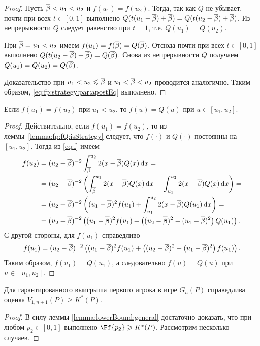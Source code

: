 {\begin{proof}
  Пусть ${\overline{\beta}} < u_1 < u_2$ и $f(u_1) = f(u_2)$.
  Тогда, так как $Q$ не убывает, почти при всех $t \in [0, 1]$ выполнено $ Q(t(u_1 - {\overline{\beta}}) + {\overline{\beta}}) = Q(t(u_2 - {\overline{\beta}}) + {\overline{\beta}})$.
  Из непрерывности $Q$ следует равенство при $t = 1$, т.е. $Q(u_1) = Q(u_2)$.

  При ${\overline{\beta}} = u_1 < u_2$ имеем $f(u_1) = f({\overline{\beta}}) = Q({\overline{\beta}})$.
  Отсюда почти при всех $t \in [0, 1]$ выполнено $Q(t(u_2 - {\overline{\beta}}) + {\overline{\beta}}) = Q({\overline{\beta}})$.
  Снова из непрерывности $Q$ получаем $Q(u_1) = Q(u_2) = Q({\overline{\beta}})$.

  Доказательство при $u_1 < u_2 \leqslant {\overline{\beta}}$ и $u_1 < {\overline{\beta}} < u_2$ проводится аналогично.
  Таким образом, \eqref{eq:fp:strategy:par:apostEq} выполнено.
\end{proof}

\begin{lemma}
  \label{lemma:f=Q}
  Если $f(u_1) = f(u_2)$ при $u_1 < u_2$, то $f(u) = Q(u)$ при $u \in [u_1, u_2]$.
\end{lemma}
\begin{proof}
  Действительно, если $f(u_1) = f(u_2)$, то из леммы~\ref{lemma:fp:fQ:isStrategy} следует, что $f(\cdot)$ и $Q(\cdot)$ постоянны на $[u_1, u_2]$.
  Тогда из \eqref{eq:f} имеем
  \begin{align*}
    f(u_2)
    &= (u_2 - {\overline{\beta}})^{-2} \int_{{\overline{\beta}}}^{u_2} 2 (x - {\overline{\beta}}) Q(x) \mathop{}\!\mathrm{d} x = \\
    &= (u_2 - {\overline{\beta}})^{-2} \left(
      \int_{{\overline{\beta}}}^{u_1} 2 (x - {\overline{\beta}}) Q(x) \mathop{}\!\mathrm{d} x \, +
      \int_{u_1}^{u_2} 2 (x - {\overline{\beta}}) Q(x) \mathop{}\!\mathrm{d} x
      \right) = \\
    &= (u_2 - {\overline{\beta}})^{-2} \left(
      (u_1 - {\overline{\beta}})^2 f(u_1) +
      \int_{u_1}^{u_2} 2 (x - {\overline{\beta}}) Q(u_1) \mathop{}\!\mathrm{d} x
      \right) = \\
    &= (u_2 - {\overline{\beta}})^{-2} \left(
      (u_1 - {\overline{\beta}})^2 f(u_1) +
      \left( (u_2 - {\overline{\beta}})^2 - (u_1 - {\overline{\beta}})^2 \right) Q(u_1)
      \right).
  \end{align*}
  С другой стороны, для $f(u_1)$ справедливо
  \begin{equation*}
    f(u_1) = (u_2 - {\overline{\beta}})^{-2} \left(
      (u_1 - {\overline{\beta}})^2 f(u_1) +
      \left( (u_2 - {\overline{\beta}})^2 - (u_1 - {\overline{\beta}})^2 \right) f(u_1)
    \right).
  \end{equation*}
  Таким образом, $f(u_1) = Q(u_1)$, а следовательно $f(u) = Q(u)$ при $u \in [u_1, u_2]$.
\end{proof}

\begin{theorem}\label{theorem:V:bound}
  Для гарантированного выигрыша первого игрока в игре $G_n(P)$ справедлива оценка $V_{1,n+1}(P) \geqslant K^*(P)$.
\end{theorem}
\begin{proof}
  В силу леммы \ref{lemma:lowerBound:general} достаточно доказать, что при любом $p_2 \in [0, 1]$ выполнено $\Ff{p_2} \geqslant K^*(P)$.
  Рассмотрим несколько случаев.


\end{proof}}
